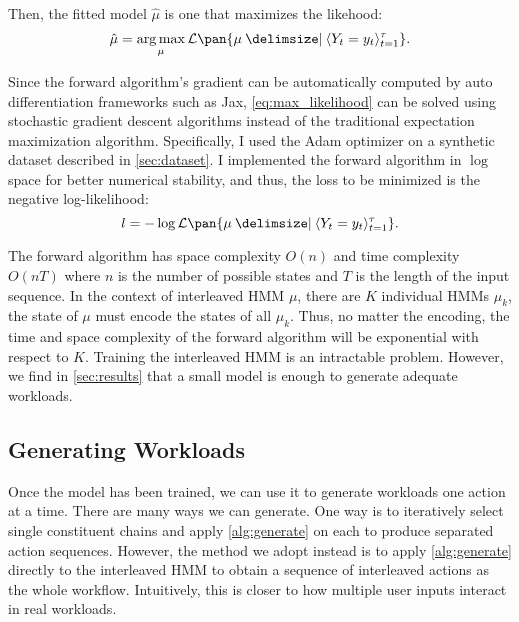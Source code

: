 Then, the fitted model \(\hat{\mu}\) is one that maximizes the likehood:
\begin{equation}
    \label{eq:max_likelihood}
    \hat{\mu} = \argmax_{\mu} \mathcal{L}\pan{\mu \giv \seq{Y_t = y_t}_{t=1}^\tau}.
\end{equation}

Since the forward algorithm's gradient can be automatically computed by auto differentiation frameworks such as Jax\cite{Bradbury2018-jz}, \cref{eq:max_likelihood} can be solved using stochastic gradient descent algorithms instead of the traditional expectation maximization algorithm\cite{Minot2014-gn}. Specifically, I used the Adam\cite{Kingma2014-jj} optimizer on a synthetic dataset described in \cref{sec:dataset}. I implemented the forward algorithm in \(\log\) space for better numerical stability, and thus, the loss to be minimized is the negative log-likelihood:
\begin{equation}
    \label{eq:neg_log_likelihood}
    l = - \log \mathcal{L}\pan{\mu \giv \seq{Y_t = y_t}_{t=1}^\tau}.
\end{equation}

The forward algorithm has space complexity \(O(n)\)  and time complexity \(O(nT)\) where \(n\) is the number of possible states and \(T\) is the length of the input sequence. In the context of interleaved HMM \(\mu\), there are \(K\) individual HMMs \(\mu_k\), the state of \(\mu\) must encode the states of all \(\mu_k\). Thus, no matter the encoding, the time and space complexity of the forward algorithm will be exponential with respect to \(K\). Training the interleaved HMM is an intractable problem\cite{Landwehr2008-vw}. However, we find in \cref{sec:results} that a small model is enough to generate adequate workloads.

\subsection{Generating Workloads}

Once the model has been trained, we can use it to generate workloads one action at a time. There are many ways we can generate. One way is to iteratively select single constituent chains and apply \cref{alg:generate} on each to produce separated action sequences. However, the method we adopt instead is to apply \cref{alg:generate} directly to the interleaved HMM to obtain a sequence of interleaved actions as the whole workflow. Intuitively, this is closer to how multiple user inputs interact in real workloads.

